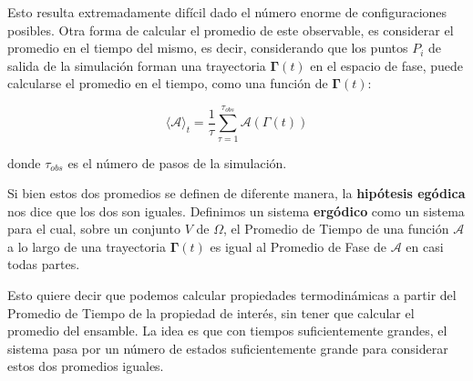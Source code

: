 Esto resulta extremadamente difícil dado el número enorme de configuraciones posibles. Otra forma de calcular el promedio de este observable, es considerar el promedio en el tiempo del mismo, es decir, considerando que los puntos $P_{i}$ de salida de la simulación forman una trayectoria $\mathbf{\Gamma}(t)$ en el espacio de fase, puede calcularse el promedio en el tiempo, como una función de $\mathbf{\Gamma}(t)$:

\begin{equation}
\langle \mathbf{\mathcal{A}} \rangle _{t} = \frac{1}{\tau} \sum_{\tau = 1}^{\tau_{obs}} \mathbf{\mathcal{A}}(\Gamma (t))
\end{equation}

donde $\tau_{obs}$ es el número de pasos de la simulación.

Si bien estos dos promedios se definen de diferente manera, la \textbf{hipótesis egódica} nos dice que los dos son iguales. Definimos un sistema \textbf{ergódico} como un sistema para el cual, sobre un conjunto $V$ de $\Omega$, el Promedio de Tiempo\footnotemark{} de una función $\mathbf{\mathcal{A}}$ a lo largo de una trayectoria $\mathbf{\Gamma}(t)$ es igual al Promedio de Fase\footnotemark{} de $\mathbf{\mathcal{A}}$ en casi todas partes\footnotemark.


Esto quiere decir que podemos calcular propiedades termodinámicas a partir del Promedio de Tiempo de la propiedad de interés, sin tener que calcular el promedio del ensamble. La idea es que con tiempos suficientemente grandes, el sistema pasa por un número de estados suficientemente grande para considerar estos dos promedios iguales.

